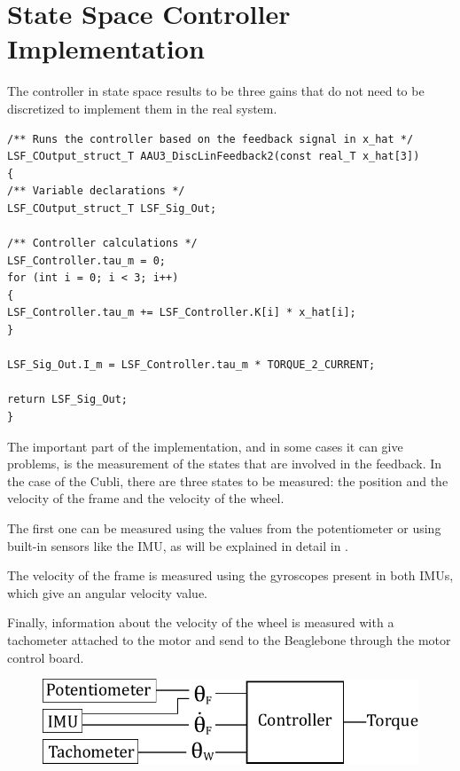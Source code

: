 \section{State Space Controller Implementation}\label{sec:SSImplementation}
The controller in state space results to be three gains that do not need to be discretized to implement them in the real system.  
\begin{lstlisting}[caption  = {Code for the implementation of the State Space Controller. The feedback from the cubli is contained in the array x\_hat.},
label    = codeStateSpaceControl ]
/** Runs the controller based on the feedback signal in x_hat */
LSF_COutput_struct_T AAU3_DiscLinFeedback2(const real_T x_hat[3])
{
/** Variable declarations */
LSF_COutput_struct_T LSF_Sig_Out;

/** Controller calculations */
LSF_Controller.tau_m = 0;
for (int i = 0; i < 3; i++)
{
LSF_Controller.tau_m += LSF_Controller.K[i] * x_hat[i];
}

LSF_Sig_Out.I_m = LSF_Controller.tau_m * TORQUE_2_CURRENT;

return LSF_Sig_Out;
}
\end{lstlisting}
The important part of the implementation, and in some cases it can give problems, is the measurement of the states that are involved in the feedback.
In the case of the Cubli, there are three states to be measured: the position and the velocity of the frame and the velocity of the wheel.

The first one can be measured using the values from the potentiometer or using built-in sensors like the IMU, as will be explained in detail in .

The velocity of the frame is measured using the gyroscopes present in both IMUs, which give an angular velocity value.

Finally, information about the velocity of the wheel is measured with a tachometer attached to the motor and send to the Beaglebone through the motor control board. 
\\
\begin{figure}[H]\vspace{-4mm}
	\centering
	\includegraphics[scale=.75]{figures/measurements}
	\label{fig:measurements}
\end{figure}\vspace{-5mm}
